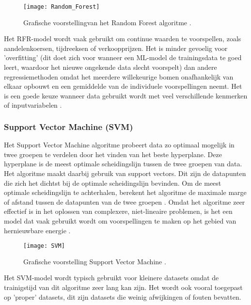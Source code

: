 \begin{figure}[h!]
    \centering\texttt{[image: Random\_Forest]}
    \caption{\label{fig:Random_Forest}Grafische voorstellingvan het Random Forest algoritme \autocite{Gunay2023}.}
\end{figure} 

Het RFR-model wordt vaak gebruikt om continue waarden te voorspellen, zoals aandelenkoersen, tijdreeksen of verkoopprijzen. Het is minder gevoelig voor 'overfitting' (dit doet zich voor wanneer een ML-model de trainingsdata te goed leert, waardoor het nieuwe ongekende data slecht voorspelt) dan andere regressiemethoden omdat het meerdere willekeurige bomen onafhankelijk van elkaar opbouwt en een gemiddelde van de individuele voorspellingen neemt. Het is een goede keuze wanneer data gebruikt wordt met veel verschillende kenmerken of inputvariabelen  \autocite{Sahai2023}.

\subsubsection{Support Vector Machine (SVM)}

Het Support Vector Machine algoritme probeert data zo optimaal mogelijk in twee groepen te verdelen door het vinden van het beste hyperplane. Deze hyperplane is de meest optimale scheidingslijn tussen de twee groepen van data. Het algoritme maakt daarbij gebruik van support vectors. Dit zijn de datapunten die zich het dichtst bij de optimale scheidingslijn bevinden. Om de meest optimale scheidingslijn te achterhalen, berekent het algoritme de maximale marge of afstand tussen de datapunten van de twee groepen  \autocite{Tziolis2024}. Omdat het algoritme zeer effectief is in het oplossen van complexere, niet-lineaire problemen, is het een model dat vaak gebruikt wordt om voorspellingen te maken op het gebied van hernieuwbare energie \autocite{Ahmad2018}. \\

\begin{figure}[h!]
    \centering\texttt{[image: SVM]}
    \caption{\label{fig:SVM}Grafische voorstelling Support Vector Machine \autocite{Tutorialspoint2024}.}
\end{figure} 

Het SVM-model wordt typisch gebruikt voor kleinere datasets omdat de trainigstijd van dit algoritme zeer lang kan zijn. Het wordt ook vooral toegepast op 'proper' datasets, dit zijn datasets die weinig afwijkingen of fouten bevatten.

